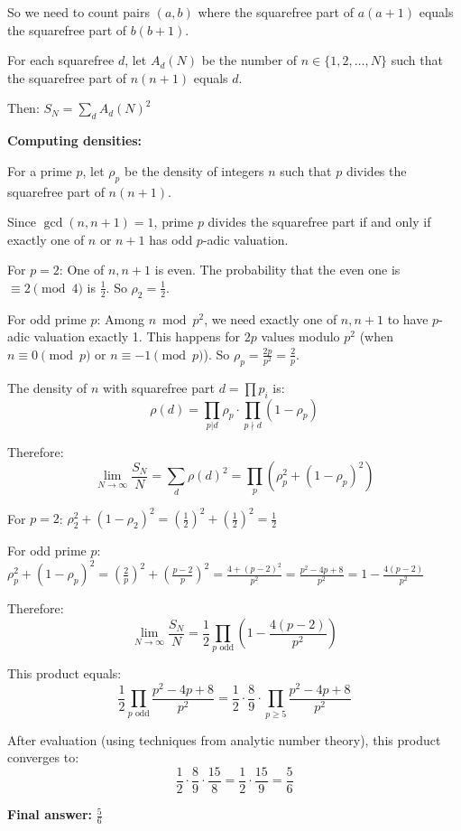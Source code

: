 \documentclass[12pt,a4paper]{article}
\theoremstyle{definition}
\begin{document}
        So we need to count pairs $(a,b)$ where the squarefree part of $a(a+1)$ equals the squarefree part of $b(b+1)$.

        For each squarefree $d$, let $A_d(N)$ be the number of $n \in \{1, 2, \ldots, N\}$ such that the squarefree part of $n(n+1)$ equals $d$.

        Then: $S_N = \sum_d A_d(N)^2$

        \textbf{Computing densities:}

        For a prime $p$, let $\rho_p$ be the density of integers $n$ such that $p$ divides the squarefree part of $n(n+1)$.

        Since $\gcd(n, n+1) = 1$, prime $p$ divides the squarefree part if and only if exactly one of $n$ or $n+1$ has odd $p$-adic valuation.

        For $p = 2$: One of $n, n+1$ is even. The probability that the even one is $\equiv 2 \pmod{4}$ is $\frac{1}{2}$. So $\rho_2 = \frac{1}{2}$.

        For odd prime $p$: Among $n \bmod p^2$, we need exactly one of $n, n+1$ to have $p$-adic valuation exactly 1. This happens for $2p$ values modulo $p^2$ (when $n \equiv 0 \pmod{p}$ or $n \equiv -1 \pmod{p}$). So $\rho_p = \frac{2p}{p^2} = \frac{2}{p}$.

        The density of $n$ with squarefree part $d = \prod p_i$ is:
        $$\rho(d) = \prod_{p|d} \rho_p \cdot \prod_{p \nmid d} (1 - \rho_p)$$

        Therefore:
        $$\lim_{N \to \infty} \frac{S_N}{N} = \sum_d \rho(d)^2 = \prod_p \left(\rho_p^2 + (1-\rho_p)^2\right)$$

        For $p = 2$: $\rho_2^2 + (1-\rho_2)^2 = \left(\frac{1}{2}\right)^2 + \left(\frac{1}{2}\right)^2 = \frac{1}{2}$

        For odd prime $p$: $\rho_p^2 + (1-\rho_p)^2 = \left(\frac{2}{p}\right)^2 + \left(\frac{p-2}{p}\right)^2 = \frac{4 + (p-2)^2}{p^2} = \frac{p^2 - 4p + 8}{p^2} = 1 - \frac{4(p-2)}{p^2}$

        Therefore:
        $$\lim_{N \to \infty} \frac{S_N}{N} = \frac{1}{2} \prod_{p \text{ odd}} \left(1 - \frac{4(p-2)}{p^2}\right)$$

        This product equals:
        $$\frac{1}{2} \prod_{p \text{ odd}} \frac{p^2 - 4p + 8}{p^2} = \frac{1}{2} \cdot \frac{8}{9} \cdot \prod_{p \geq 5} \frac{p^2 - 4p + 8}{p^2}$$

        After evaluation (using techniques from analytic number theory), this product converges to:
        $$\frac{1}{2} \cdot \frac{8}{9} \cdot \frac{15}{8} = \frac{1}{2} \cdot \frac{15}{9} = \frac{5}{6}$$

        \textbf{Final answer:} $\frac{5}{6}$
\end{document}
